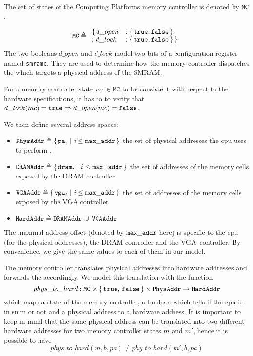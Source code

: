The set of states of the  Computing Platforms memory
controller is denoted by $\mathtt{MC}$.

\[
  \texttt{MC} \triangleq
  \begin{array}{ll}
    \{\,d\_open &: \{\,\mathtt{true}, \mathtt{false}\,\} \\
    ;\,d\_lock &: \{\,\mathtt{true}, \mathtt{false}\,\}\,\}
  \end{array}
\]
%
The two booleans $d\_open$ and $d\_lock$ model two bits of a configuration
register named \texttt{smramc}.
%
They are used to determine how the memory controller dispatches the \IO which
targets a physical address of the SMRAM.

For a memory controller state $mc \in \texttt{MC}$ to be consistent with respect
to the hardware specifications, it has to to verify that
$d\_lock(mc) = \mathtt{true} \Rightarrow d\_open(mc) = \mathtt{false}$.

We then define several address spaces:
%
\begin{itemize}
\item $\texttt{PhysAddr} \triangleq \{\,\mathtt{pa}_i\ |\ i \leq \mathtt{max\_addr}\,\}$
  the set of physical addresses the \ac{cpu} uses to perform \IO.
%
\item
  $\texttt{DRAMAddr} \triangleq \{\,\mathtt{dram}_i\ |\ i \leq \mathtt{max\_addr}\,\}$
  the set of addresses of the memory cells exposed by the DRAM controller
%
\item $\texttt{VGAAddr} \triangleq \{\,\mathtt{vga}_i\ |\ i \leq \mathtt{max\_addr}\,\}$
  the set of addresses of the memory cells exposed by the VGA controller
%
\item $\texttt{HardAddr} \triangleq \texttt{DRAMAddr}\,\cup\,\texttt{VGAAddr}$
\end{itemize}

The maximal address offset (denoted by $\mathtt{max\_addr}$ here) is specific to
the \ac{cpu} (for the physical addresses), the DRAM controller and the
VGA controller. By convenience, we give the same values to each of them in our
model.

The memory controller translates physical addresses into hardware addresses and
forwards the \IO accordingly.
%
We model this translation with the function
%
\[
  phys\_to\_hard : \texttt{MC} \times \{\,\mathtt{true},\,\mathtt{false}\,\}
  \times \texttt{PhysAddr} \rightarrow \texttt{HardAddr}
\]
%
which maps a state of the memory controller, a boolean which tells if the
\ac{cpu} is in \ac{smm} or not and a physical address to a hardware address.
%
It is important to keep in mind that the same physical address can be translated
into two different hardware addresses for two memory controller states $m$ and
$m'$, hence it is possible to have
%
\[
  phys\_to\_hard(m, b, pa) \neq phy\_to\_hard(m', b, pa)
\]

